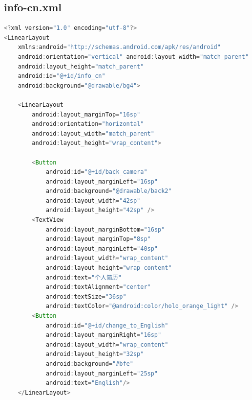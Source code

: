 \documentclass[UTF8, Microsoft YaHei]{book}
\begin{document}
    \subsection{info-cn.xml}
\begin{small}
\begin{lstlisting}[language=java]
<?xml version="1.0" encoding="utf-8"?>
<LinearLayout
    xmlns:android="http://schemas.android.com/apk/res/android"
    android:orientation="vertical" android:layout_width="match_parent"
    android:layout_height="match_parent"
    android:id="@+id/info_cn"
    android:background="@drawable/bg4">

    <LinearLayout
        android:layout_marginTop="16sp"
        android:orientation="horizontal"
        android:layout_width="match_parent"
        android:layout_height="wrap_content">

        <Button
            android:id="@+id/back_camera"
            android:layout_marginLeft="16sp"
            android:background="@drawable/back2"
            android:layout_width="42sp"
            android:layout_height="42sp" />
        <TextView
            android:layout_marginBottom="16sp"
            android:layout_marginTop="8sp"
            android:layout_marginLeft="40sp"
            android:layout_width="wrap_content"
            android:layout_height="wrap_content"
            android:text="个人简历"
            android:textAlignment="center"
            android:textSize="36sp"
            android:textColor="@android:color/holo_orange_light" />
        <Button
            android:id="@+id/change_to_English"
            android:layout_marginRight="16sp"
            android:layout_width="wrap_content"
            android:layout_height="32sp"
            android:background="#bfe"
            android:layout_marginLeft="25sp"
            android:text="English"/>
    </LinearLayout>


\end{lstlisting}
\end{small}
\end{document}
